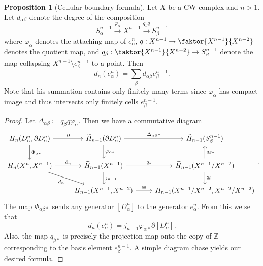 \documentclass[10pt,letterpaper,cm]{nupset}
\theoremstyle{definition}
\theoremstyle{theorem}
\newtheorem{prop}[definition]{Proposition}
\theoremstyle{remark}
\newcommand{\Z}{\mathbb Z}
\newcommand{\1}{\mathbb{1}}
\newcommand{\0}{\vec 0}
\begin{document}
\begin{prop}[Cellular boundary formula]
Let $X$ be a CW-complex and $n>1$. Let $d_{\alpha \beta}$ denote the degree of the composition $$S_{\alpha}^{n-1} \overset{\varphi_{\alpha}}{\longrightarrow} X^{n-1} \overset{q_{\beta}q}{\longrightarrow} S_{\beta}^{n-1}$$ where $\varphi_{\alpha}$ denotes the attaching map of $e_{\alpha}^n$, $q: X^{n-1} \to \faktor{X^{n-1}}{X^{n-2}}$ denotes the quotient map, and $q_{\beta} : \faktor{X^{n-1}}{X^{n-2}} \to S_{\beta}^{n-1}$ denote the map collapsing $X^{n-1} \setminus e_{\beta}^{n-1}$ to a point. Then $$  d_n(e_{\alpha}^n) = \sum_{\beta} d_{\alpha{\beta}}e_{\beta}^{n-1} .$$ Note that his summation contains only finitely many terms since $\varphi_{\alpha}$ has compact image and thus intersects only finitely cells $e_{\beta}^{n-1}$.
\end{prop}
\begin{proof}
Let $\Delta_{\alpha{\beta}}\coloneqq  q_{\beta}q \varphi_{\alpha}$. Then we have a commutative diagram
\[
\begin{tikzcd}
{H_n(D^n_{\alpha}, \partial{D_{\alpha}^n})} \arrow[d, "\Phi_{\alpha{\ast}}"] \arrow[r, "\partial"] & \widetilde{H}_{n-1}(\partial{D_{\alpha}^n}) \arrow[r, "\Delta_{\alpha{\beta}}{\ast}"] \arrow[d, "\varphi_{\alpha{\ast}}"] & \widetilde{H}_{n-1}(S_{\beta}^{n-1})                                                  \\
{H_n(X^n, X^{n-1})} \arrow[rd, "d_n"'] \arrow[r, "\partial_n"]                                     & \widetilde{H}_{n-1}(X^{n-1}) \arrow[r, "q_{\ast}"] \arrow[d, "j_{n-1}"]                                                   & \widetilde{H}_{n-1}(X^{n-1}/X^{n-2}) \arrow[u, "q_{\beta{\ast}}"'] \arrow[d, "\cong"] \\
                                                                                                   & {H_{n-1}(X^{n-1}, X^{n-2})} \arrow[r, "\cong"]                                                                            & {H_{n-1}(X^{n-1}/X^{n-2}, X^{n-2}/X^{n-2})}                                          
\end{tikzcd}
.\] The map $\Phi_{\alpha{\beta}{\ast}}$ sends any generator $[D_{\alpha}^n]$ to the generator $e_{\alpha}^n$. From this we se that $$  d_n(e_{\alpha}^n) = j_{n-1}\varphi_{\alpha{\ast}}\partial{[D_{\alpha}^n]}  .$$ Also, the map $q_{\beta{\ast}}$ is precisely the projection map onto the copy of $\Z$ corresponding to the basis element $e_{\beta}^{n-1}$. A simple diagram chase yields our desired formula. 
\end{proof}
\end{document}
